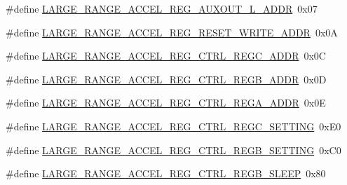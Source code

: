 \begin{DoxyCompactItemize}
\item 
\#define \hyperlink{group___large_range_accel_gab048042c0057ef6f8f1d153eca6b91ea}{L\+A\+R\+G\+E\+\_\+\+R\+A\+N\+G\+E\+\_\+\+A\+C\+C\+E\+L\+\_\+\+R\+E\+G\+\_\+\+A\+U\+X\+O\+U\+T\+\_\+\+L\+\_\+\+A\+D\+DR}~0x07
\item 
\#define \hyperlink{group___large_range_accel_ga8a6470f4fd5b0b53bcbc3a7526689e07}{L\+A\+R\+G\+E\+\_\+\+R\+A\+N\+G\+E\+\_\+\+A\+C\+C\+E\+L\+\_\+\+R\+E\+G\+\_\+\+R\+E\+S\+E\+T\+\_\+\+W\+R\+I\+T\+E\+\_\+\+A\+D\+DR}~0x0A
\item 
\#define \hyperlink{group___large_range_accel_ga65a40840ee50d20d2318864e88f3ceb1}{L\+A\+R\+G\+E\+\_\+\+R\+A\+N\+G\+E\+\_\+\+A\+C\+C\+E\+L\+\_\+\+R\+E\+G\+\_\+\+C\+T\+R\+L\+\_\+\+R\+E\+G\+C\+\_\+\+A\+D\+DR}~0x0C
\item 
\#define \hyperlink{group___large_range_accel_ga253286907acd8e477925fdb068fcd3bd}{L\+A\+R\+G\+E\+\_\+\+R\+A\+N\+G\+E\+\_\+\+A\+C\+C\+E\+L\+\_\+\+R\+E\+G\+\_\+\+C\+T\+R\+L\+\_\+\+R\+E\+G\+B\+\_\+\+A\+D\+DR}~0x0D
\item 
\#define \hyperlink{group___large_range_accel_gad2fa6db2d889c7ab1c8605db2ea71d61}{L\+A\+R\+G\+E\+\_\+\+R\+A\+N\+G\+E\+\_\+\+A\+C\+C\+E\+L\+\_\+\+R\+E\+G\+\_\+\+C\+T\+R\+L\+\_\+\+R\+E\+G\+A\+\_\+\+A\+D\+DR}~0x0E
\item 
\#define \hyperlink{group___large_range_accel_ga2979b53d21452bab4f9bcb36c9569b42}{L\+A\+R\+G\+E\+\_\+\+R\+A\+N\+G\+E\+\_\+\+A\+C\+C\+E\+L\+\_\+\+R\+E\+G\+\_\+\+C\+T\+R\+L\+\_\+\+R\+E\+G\+C\+\_\+\+S\+E\+T\+T\+I\+NG}~0x\+E0
\item 
\#define \hyperlink{group___large_range_accel_ga78294423504092bfda6f63240b4ad652}{L\+A\+R\+G\+E\+\_\+\+R\+A\+N\+G\+E\+\_\+\+A\+C\+C\+E\+L\+\_\+\+R\+E\+G\+\_\+\+C\+T\+R\+L\+\_\+\+R\+E\+G\+B\+\_\+\+S\+E\+T\+T\+I\+NG}~0x\+C0
\item 
\#define \hyperlink{group___large_range_accel_gafa85c087d02fe049ae15bc4138c4a5d7}{L\+A\+R\+G\+E\+\_\+\+R\+A\+N\+G\+E\+\_\+\+A\+C\+C\+E\+L\+\_\+\+R\+E\+G\+\_\+\+C\+T\+R\+L\+\_\+\+R\+E\+G\+B\+\_\+\+S\+L\+E\+EP}~0x80
\end{DoxyCompactItemize}
